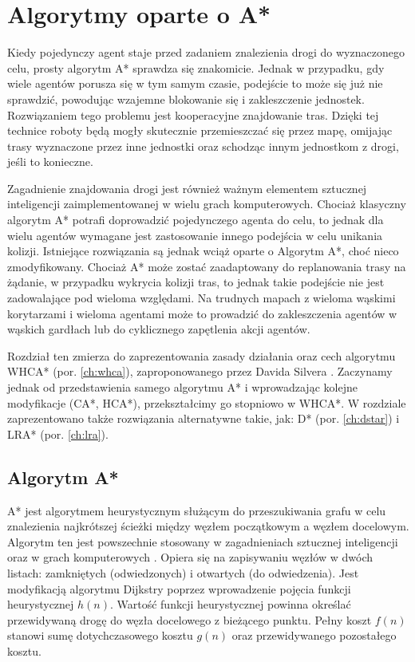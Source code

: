\chapter{Algorytmy oparte o A*}
\label{ch:astar}

Kiedy pojedynczy agent staje przed zadaniem znalezienia drogi do wyznaczonego celu, prosty algorytm A* sprawdza się znakomicie. Jednak w przypadku, gdy wiele agentów porusza się w tym samym czasie, podejście to może się już nie sprawdzić, powodując wzajemne blokowanie się i zakleszczenie jednostek. Rozwiązaniem tego problemu jest kooperacyjne znajdowanie tras. Dzięki tej technice roboty będą mogły skutecznie przemieszczać się przez mapę, omijając trasy wyznaczone przez inne jednostki oraz schodząc innym jednostkom z drogi, jeśli to konieczne. \cite{cooppath}

Zagadnienie znajdowania drogi jest również ważnym elementem sztucznej inteligencji zaimplementowanej w wielu grach komputerowych. Chociaż klasyczny algorytm A* potrafi doprowadzić pojedynczego agenta do celu, to jednak dla wielu agentów wymagane jest zastosowanie innego podejścia w celu unikania kolizji. Istniejące rozwiązania są jednak wciąż oparte o Algorytm A*, choć nieco zmodyfikowany. Chociaż A* może zostać zaadaptowany do replanowania trasy na żądanie, w przypadku wykrycia kolizji tras, to jednak takie podejście nie jest zadowalające pod wieloma względami. Na trudnych mapach z wieloma wąskimi korytarzami i wieloma agentami może to prowadzić do zakleszczenia agentów w wąskich gardłach lub do cyklicznego zapętlenia akcji agentów. \cite{cooppath}

Rozdział ten zmierza do zaprezentowania zasady działania oraz cech algorytmu WHCA* (por. \ref{ch:whca}), zaproponowanego przez Davida Silvera \cite{cooppath}. Zaczynamy jednak od przedstawienia samego algorytmu A* i wprowadzając kolejne modyfikacje (CA*, HCA*), przekształcimy go stopniowo w WHCA*.
W rozdziale zaprezentowano także rozwiązania alternatywne takie, jak: D* (por. \ref{ch:dstar}) i LRA* (por. \ref{ch:lra}).

\section{Algorytm A*}
A* jest algorytmem heurystycznym służącym do przeszukiwania grafu w celu znalezienia najkrótszej ścieżki między węzłem początkowym a węzłem docelowym. Algorytm ten jest powszechnie stosowany w zagadnieniach sztucznej inteligencji oraz w grach komputerowych \cite{mit_astar}. Opiera się na zapisywaniu węzłów w dwóch listach: zamkniętych (odwiedzonych) i otwartych (do odwiedzenia). Jest modyfikacją algorytmu Dijkstry poprzez wprowadzenie pojęcia funkcji heurystycznej $h(n)$. Wartość funkcji heurystycznej powinna określać przewidywaną drogę do węzła docelowego z bieżącego punktu. Pełny koszt $f(n)$ stanowi sumę dotychczasowego kosztu $g(n)$ oraz przewidywanego pozostałego kosztu.


